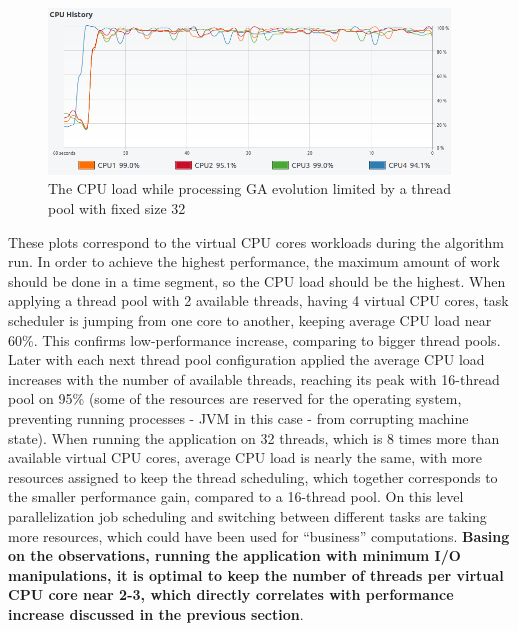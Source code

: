 \begin{figure}[H]
\centering\includegraphics[width=0.95\textwidth]{img/exp/2/limit-threadpool-32}
\caption{The CPU load while processing GA evolution limited by a thread pool with fixed size 32 }  \label{img:cpu-thread-32}
\end{figure}

These plots correspond to the virtual CPU cores workloads during the algorithm run. In order to achieve the highest performance, the maximum amount of work should be done in a time segment, so the CPU load should be the highest. When applying a  thread pool with 2 available threads, having 4 virtual CPU cores, task scheduler is jumping from one core to another, keeping average CPU load near 60\%. This confirms low-performance increase, comparing to bigger thread pools. Later with each next thread pool configuration applied the average CPU load increases with the number of available threads, reaching its peak with 16-thread pool on 95\% (some of the resources are reserved for the operating system, preventing running processes - JVM in this case - from corrupting machine state). When running the application on 32 threads, which is 8 times more than available virtual CPU cores, average CPU load is nearly the same, with more resources assigned to keep the thread scheduling, which together corresponds to the smaller performance gain, compared to a 16-thread pool. On this level parallelization job scheduling and switching between different tasks are taking more resources, which could have been used for ``business'' computations. \textbf{Basing on the observations, running the application with minimum I/O manipulations, it is optimal to keep the number of threads per virtual CPU core near 2-3, which directly correlates with performance increase discussed in the previous section}.
